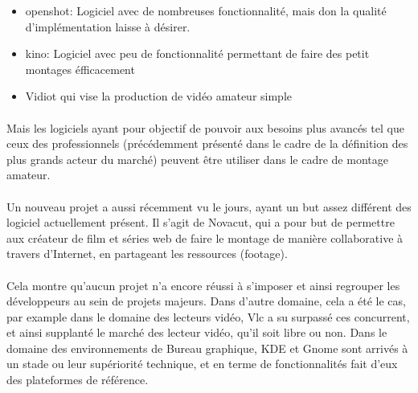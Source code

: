 \begin {itemize}

  \item {openshot: Logiciel avec de nombreuses fonctionnalité, mais don la
    qualité d'implémentation laisse à désirer.}

  \item {kino: Logiciel avec peu de fonctionnalité permettant de faire des
    petit montages éfficacement}

  \item {Vidiot qui vise la production de vidéo amateur simple}

\end {itemize}

\paragraph {}

Mais les logiciels ayant pour objectif de pouvoir aux besoins plus
avancés tel que ceux des professionnels (précédemment présenté
dans le cadre de la définition des plus grands acteur du marché)
peuvent être utiliser dans le cadre de montage amateur.

\paragraph{}

Un nouveau projet a aussi récemment vu le jours, ayant un but assez
différent des logiciel actuellement présent. Il s'agit de Novacut,
qui a pour but de permettre aux créateur de film et séries web de
faire le montage de manière collaborative à travers d'Internet, en
partageant les ressources (footage).

\paragraph{}

Cela montre qu'aucun projet n'a encore réussi à s'imposer et ainsi
regrouper les développeurs au sein de projets majeurs. Dans d'autre
domaine, cela a été le cas, par example dans le domaine des lecteurs
vidéo, Vlc a su surpassé ces concurrent, et ainsi supplanté le
marché des lecteur vidéo, qu'il soit libre ou non. Dans le domaine
des environnements de Bureau graphique, KDE et Gnome sont arrivés à un
stade ou leur supériorité technique, et en terme de fonctionnalités
fait d'eux des plateformes de référence.

\paragraph{}

